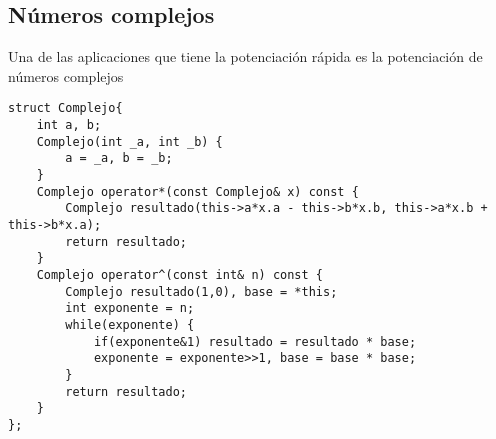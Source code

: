 \subsection{Números complejos}

Una de las aplicaciones que tiene la potenciación rápida es la potenciación de números complejos
\begin{minipage}{\textwidth}
\begin{lstlisting}[style=C,caption=PotenciacionComplejos.cpp]
struct Complejo{
    int a, b;
    Complejo(int _a, int _b) {
        a = _a, b = _b;
    }
    Complejo operator*(const Complejo& x) const {
        Complejo resultado(this->a*x.a - this->b*x.b, this->a*x.b + this->b*x.a);
        return resultado;
    }
    Complejo operator^(const int& n) const {
        Complejo resultado(1,0), base = *this;
        int exponente = n;
        while(exponente) {
            if(exponente&1)	resultado = resultado * base;
            exponente = exponente>>1, base = base * base;
        }
        return resultado;
    }
};
\end{lstlisting}
\end{minipage}
